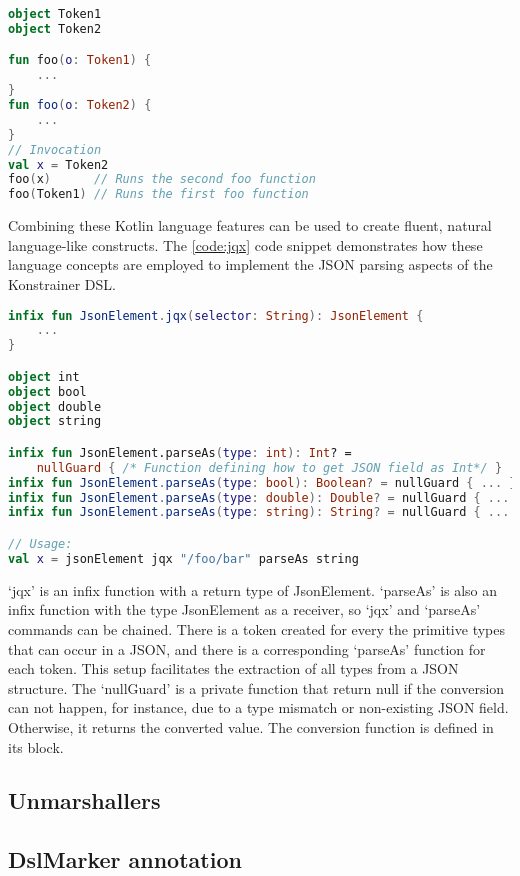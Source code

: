 \begin{lstlisting}[caption={Pattern matching},language=Kotlin,label=code:patternobj]
object Token1
object Token2

fun foo(o: Token1) {
    ...
}
fun foo(o: Token2) {
    ...
}
// Invocation
val x = Token2
foo(x)      // Runs the second foo function
foo(Token1) // Runs the first foo function
\end{lstlisting}

Combining these Kotlin language features can be used to create fluent, natural language-like constructs. The \ref{code:jqx} code snippet demonstrates how these language concepts are employed to implement the JSON parsing aspects of the Konstrainer DSL.

\begin{lstlisting}[caption={jqx implementation},language=Kotlin,label=code:jqx]
infix fun JsonElement.jqx(selector: String): JsonElement {
    ...
}

object int
object bool
object double
object string

infix fun JsonElement.parseAs(type: int): Int? = 
    nullGuard { /* Function defining how to get JSON field as Int*/ }
infix fun JsonElement.parseAs(type: bool): Boolean? = nullGuard { ... }
infix fun JsonElement.parseAs(type: double): Double? = nullGuard { ... }
infix fun JsonElement.parseAs(type: string): String? = nullGuard { ... }

// Usage:
val x = jsonElement jqx "/foo/bar" parseAs string
\end{lstlisting}

`jqx' is an infix function with a return type of JsonElement. `parseAs' is also an infix function with the type JsonElement as a receiver, so `jqx' and `parseAs' commands can be chained. There is a token created for every the primitive types that can occur in a JSON, and there is a corresponding `parseAs' function for each token. This setup facilitates the extraction of all types from a JSON structure. The `nullGuard' is a private function that return null if the conversion can not happen, for instance, due to a type mismatch or non-existing JSON field. Otherwise, it returns the converted value. The conversion function is defined in its block.

\subsection{Unmarshallers}



\subsection{DslMarker annotation}

